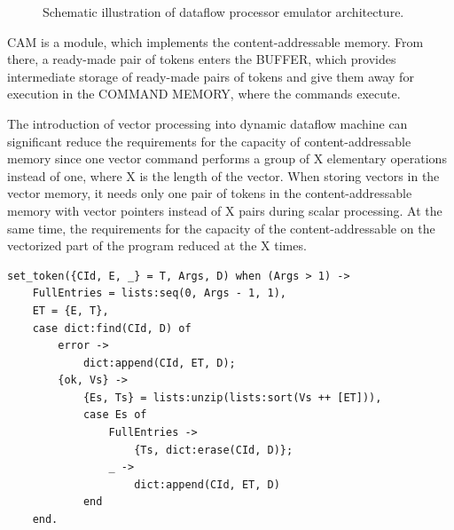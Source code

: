 \documentclass[
11pt,%
tightenlines,%
twoside,%
onecolumn,%
nofloats,%
nobibnotes,%
nofootinbib,%
superscriptaddress,%
noshowpacs,%
centertags]%
{revtex4}
\begin{document}
\begin{figure}[h!]
\setcaptionmargin{5mm}
\onelinecaptionsfalse
{}
\caption{Schematic illustration of dataflow processor emulator architecture.}
\label{fig:dataflow_emulator}
\end{figure}

CAM is a module, which implements the content-addressable memory. From there, a ready-made pair of tokens enters the BUFFER, which provides intermediate storage of ready-made pairs of tokens and give them away for execution in the COMMAND MEMORY, where the commands execute.

The introduction of vector processing into dynamic dataflow machine can significant reduce the requirements for the capacity of content-addressable memory since one vector command performs a group of X elementary operations instead of one, where X is the length of the vector. When storing vectors in the vector memory, it needs only one pair of tokens in the content-addressable memory with vector pointers instead of X pairs during scalar processing. At the same time, the requirements for the capacity of the content-addressable on the vectorized part of the program reduced at the X times.


\begin{lstlisting}[caption={Implementation of the logic of the contest-addressable token memory.},label={lst:assoc}]
set_token({CId, E, _} = T, Args, D) when (Args > 1) ->
	FullEntries = lists:seq(0, Args - 1, 1),
	ET = {E, T},
	case dict:find(CId, D) of
		error ->
			dict:append(CId, ET, D);
		{ok, Vs} ->
			{Es, Ts} = lists:unzip(lists:sort(Vs ++ [ET])),
			case Es of
				FullEntries ->
					{Ts, dict:erase(CId, D)};
				_ ->
					dict:append(CId, ET, D)
			end
	end.
\end{lstlisting}
\end{document}
